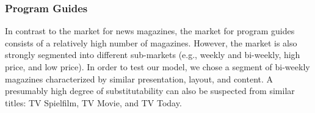\documentclass[12pt,a4paper,notitlepage]{article}
\begin{document}
\begin{figure}[H]
	\label{fig_fss}
\end{figure}



\subsubsection{Program Guides}

In contrast to the market for news magazines, the market for program guides consists of a relatively high number of magazines. However, the market is also strongly segmented into different sub-markets (e.g., weekly and bi-weekly, high price, and low price). In order to test our model, we chose a segment of bi-weekly magazines characterized by similar presentation, layout, and content. A presumably high degree of substitutability can also be suspected from similar titles: TV Spielfilm, TV Movie, and TV Today.  
\end{document}
